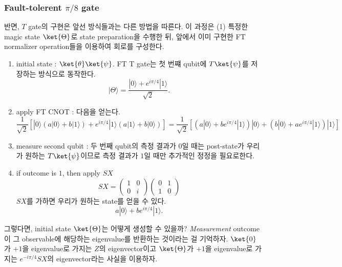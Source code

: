 \subsubsection{Fault-tolerent $\pi/8$ gate}
반면, $T$ gate의 구현은 앞선 방식들과는 다른 방법을 따른다. 이 과정은 (1) 특정한 magic state $\ket{\Theta}$로 state preparation을 수행한 뒤, 앞에서 이미 구현한 FT normalizer operation들을 이용하여 회로를 구성한다.
\begin{enumerate}
    \item initial state : $\ket{\theta}\ket{\psi}$. FT T gate는 첫 번쨰 qubit에 $T\ket{\psi}$를 저장하는 방식으로 동작한다. 
    \begin{equation*}
        |\Theta\rangle=\frac{|0\rangle+e^{i \pi / 4}|1\rangle}{\sqrt{2}} .
    \end{equation*}    
    \item apply FT CNOT : 다음을 얻는다.
    \begin{equation*}
        \frac{1}{\sqrt{2}}\left[|0\rangle(a|0\rangle+b|1\rangle)+e^{i \pi / 4}|1\rangle(a|1\rangle+b|0\rangle)\right]=\frac{1}{\sqrt{2}}\left[\left(a|0\rangle+b e^{i \pi / 4}|1\rangle\right)|0\rangle+\left(b|0\rangle+a e^{i \pi / 4}|1\rangle\right)|1\rangle\right]
    \end{equation*}
    \item measure second qubit : 두 번째 qubit의 측정 결과가 $0$일 때는 post-state가 우리가 원하는 $T \ket{\psi}$이므로 측정 결과가 $1$일 때만 추가적인 정정을 필요로한다.
    \item if outcome is $1$, then apply $SX$
    \begin{equation*}
        S X=\left(\begin{array}{ll}
            1 & 0 \\
            0 & i
            \end{array}\right)\left(\begin{array}{ll}
            0 & 1 \\
            1 & 0
            \end{array}\right)
    \end{equation*}
    $SX$를 가하면 우리가 원하는 state를 얻을 수 있다. 
    \begin{equation*}
        a|0\rangle+b e^{i \pi / 4}|1\rangle .
    \end{equation*}    
\end{enumerate}
그렇다면, initial state $\ket{\Theta}$는 어떻게 생성할 수 있을까? \textit{Measurement} outcome이 그 observable에 해당하는 eigenvalue를 반환하는 것이라는 걸 기억하자.
$\ket{0}$가 $+1$을 eigenvalue로 가지는 $Z$의 eigenvector이고 $\ket{\Theta}$가 $+1$을 eigenvalue로 가지는 $e^{-i\pi/4}SX$의 eigenvector라는 사실을 이용하자.

